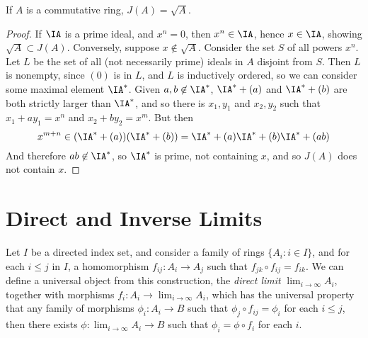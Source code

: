 \begin{theorem}
    If $A$ is a commutative ring, $J(A) = \sqrt{A}$.
\end{theorem}
\begin{proof}
    If $\IA$ is a prime ideal, and $x^n = 0$, then $x^n \in \IA$, hence $x \in \IA$, showing $\sqrt{A} \subset J(A)$. Conversely, suppose $x \not \in \sqrt{A}$. Consider the set $S$ of all powers $x^n$. Let $L$ be the set of all (not necessarily prime) ideals in $A$ disjoint from $S$. Then $L$ is nonempty, since $(0)$ is in $L$, and $L$ is inductively ordered, so we can consider some maximal element $\IA^*$. Given $a,b \not \in \IA^*$, $\IA^* + (a)$ and $\IA^* + (b)$ are both strictly larger than $\IA^*$, and so there is $x_1,y_1$ and $x_2,y_2$ such that $x_1 + ay_1 = x^n$ and $x_2 + by_2 = x^m$. But then
    \[ x^{m+n} \in (\IA^* + (a))(\IA^* + (b)) = \IA^* + (a) \IA^* + (b) \IA^* + (ab) \]
    And therefore $ab \not \in \IA^*$, so $\IA^*$ is prime, not containing $x$, and so $J(A)$ does not contain $x$.
\end{proof}

\section{Direct and Inverse Limits}

Let $I$ be a directed index set, and consider a family of rings $\{ A_i : i \in I \}$, and for each $i \leq j$ in $I$, a homomorphism $f_{ij}: A_i \to A_j$ such that $f_{jk} \circ f_{ij} = f_{ik}$. We can define a universal object from this construction, the \emph{direct limit} $\lim_{i \to \infty} A_i$, together with morphisms $f_i: A_i \to \lim_{i \to \infty} A_i$, which has the universal property that any family of morphisms $\phi_i: A_i \to B$ such that $\phi_j \circ f_{ij} = \phi_i$ for each $i \leq j$, then there exists $\phi: \lim_{i \to \infty} A_i \to B$ such that $\phi_i = \phi \circ f_i$ for each $i$.

